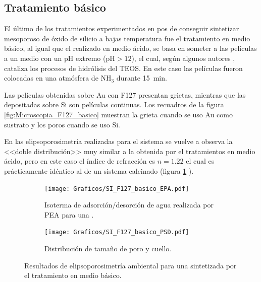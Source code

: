 {	\subsection{Tratamiento básico}

		El último de los tratamientos experimentados en pos de conseguir sintetizar mesoporoso de óxido de silicio a bajas temperatura fue el tratamiento en medio básico, al igual que el realizado en medio ácido, se basa en someter a las películas a un medio con un pH extremo (pH$>12$), el cual, según algunos autores \cite{Soler-Illia2011,Huo1996,Ichinose2002}, cataliza los procesos de hidrólisis del TEOS. En este caso las películas fueron colocadas en una atmósfera de NH$_3$ durante \SI{15}{\minute}. 

		Las películas obtenidas sobre Au con F127 presentan grietas, mientras que las depositadas sobre Si son películas continuas. Los recuadros de la figura \ref{fig:Microscopia_F127_basico} muestran la grieta cuando se uso Au como sustrato y los poros cuando se uso Si.

		En las elipsoporosimetría realizadas para el sistema \pdmF\space se vuelve a observa la <<doble distribución>> muy similar a la obtenida por el tratamientos en medio ácido, pero en este caso el índice de refracción es $n=1.22$ el cual es prácticamente idéntico al de un sistema calcinado (figura \ref{fig:F127_basico_EPA} ).

		\begin{figure}[!ht]
		  	\begin{subfigure}[t]{0.495\textwidth}
		  	\texttt{[image: Graficos/SI\_F127\_basico\_EPA.pdf]}
			\caption[Elipsoporsimetría \pdmF\space tratamiento básico.]{Isoterma de adsorción/desorción de agua realizada por PEA para una \pdmF.}
			\label{fig:F127_basico_EPA}
			\end{subfigure}
			\begin{subfigure}[t]{0.495\textwidth}
		  	\texttt{[image: Graficos/SI\_F127\_basico\_PSD.pdf]}
			\caption{Distribución de tamaño de poro y cuello.\\ }
			\label{fig:F127_basico_PSD}
			\end{subfigure}
			\caption[Elipsoporosimetría \pdmF\space tratamiento básico.]{Resultados de elipsoporosimetría ambiental para una \pdmF\space sintetizada por el tratamiento en medio básico.}
			\end{figure}

}
